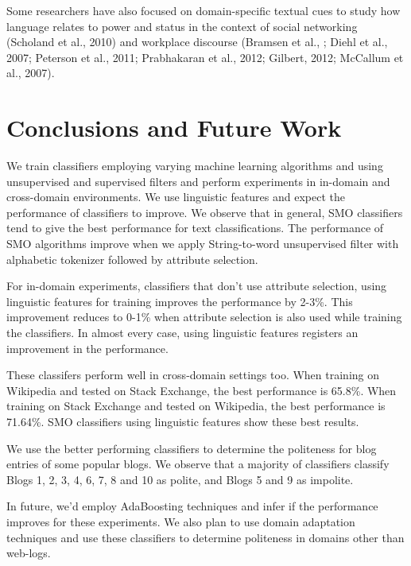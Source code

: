 \documentclass[conference]{IEEEtran}
\begin{document}
Some researchers have also focused on domain-specific textual cues to study how language relates to power and status in the context of social networking (Scholand et al., 2010) and workplace discourse (Bramsen et al., ; Diehl et al., 2007; Peterson et al., 2011; Prabhakaran et al., 2012; Gilbert, 2012; McCallum et al., 2007).

\section{Conclusions and Future Work}
We train classifiers employing varying machine learning algorithms and using unsupervised and supervised filters and perform experiments in in-domain and cross-domain environments. We use linguistic features and expect the performance of classifiers to improve. We observe that in general, SMO classifiers tend to give the best performance for text classifications. The performance of SMO algorithms improve when we apply String-to-word unsupervised filter with alphabetic tokenizer followed by attribute selection. 

For in-domain experiments, classifiers that don't use attribute selection, using linguistic features for training improves the performance by 2-3\%. This improvement reduces to 0-1\% when attribute selection is also used while training the classifiers. In almost every case, using linguistic features registers an improvement in the performance.

These classifers perform well in cross-domain settings too. When training on Wikipedia and tested on Stack Exchange, the best performance is 65.8\%. When training on Stack Exchange and tested on Wikipedia, the best performance is 71.64\%. SMO classifiers using linguistic features show these best results.

We use the better performing classifiers to determine the politeness for blog entries of some popular blogs. We observe that a majority of classifiers classify Blogs 1, 2, 3, 4, 6, 7, 8 and 10 as polite, and Blogs 5 and 9 as impolite.

In future, we'd employ AdaBoosting techniques and infer if the performance improves for these experiments. We also plan to use domain adaptation techniques and use these classifiers to determine politeness in domains other than web-logs.
\end{document}
